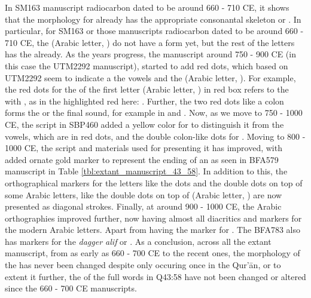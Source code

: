 In SM163 manuscript radiocarbon dated to be around 660 - 710 CE, it shows that the morphology for   already has the appropriate consonantal skeleton or  . In particular, for SM163 or those manuscripts radiocarbon dated to be around 660 - 710 CE, the   (Arabic letter, ) do not have a form yet, but the rest of the letters has the   already. As the years progress, the manuscript around 750 - 900 CE (in this case the UTM2292 manuscript), started to add red dots, which based on UTM2292 seem to indicate a the vowels and the   (Arabic letter, ). For example, the red dots for the   of the first letter   (Arabic letter, ) in red box refers to the   with  , as in the highlighted red here:  . Further, the two red dots like a colon forms the   or the final   sound, for example in   and  . Now, as we move to 750 - 1000 CE, the script in SBP460 added a yellow color for   to distinguish it from the vowels, which are in red dots, and the double colon-like dots for  . Moving to 800 - 1000 CE, the script and materials used for presenting it has improved, with added ornate gold marker to represent the ending of an   as seen in BFA579 manuscript in Table \ref{tbl:extant_manuscript_43_58}. In addition to this, the orthographical markers for the letters like the dots and the double dots on top of some Arabic letters, like the double dots on top of   (Arabic letter, ) are now presented as diagonal strokes. Finally, at around 900 - 1000 CE, the Arabic orthographies improved further, now having almost all diacritics and markers for the modern Arabic letters. Apart from having the marker for  . The BFA783 also has markers for the \textit{dagger alif} or  . As a conclusion, across all the extant manuscript, from as early as 660 - 700 CE to the recent ones, the morphology of the   has never been changed despite only occuring once in the Qur'\=an, or to extent it further, the   of the full words in Q43:58 have not been changed or altered since the 660 - 700 CE manuscripts.

